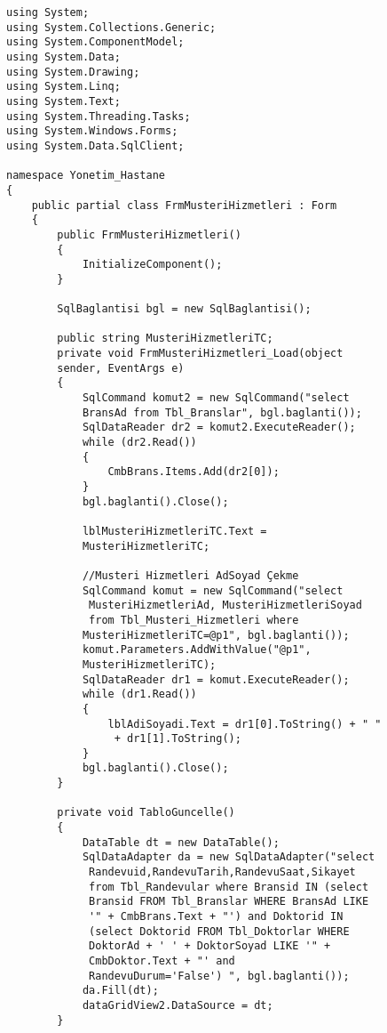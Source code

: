 \begin{lstlisting}
using System;
using System.Collections.Generic;
using System.ComponentModel;
using System.Data;
using System.Drawing;
using System.Linq;
using System.Text;
using System.Threading.Tasks;
using System.Windows.Forms;
using System.Data.SqlClient;

namespace Yonetim_Hastane
{
    public partial class FrmMusteriHizmetleri : Form
    {
        public FrmMusteriHizmetleri()
        {
            InitializeComponent();
        }

        SqlBaglantisi bgl = new SqlBaglantisi();

        public string MusteriHizmetleriTC;
        private void FrmMusteriHizmetleri_Load(object 
        sender, EventArgs e)
        {
            SqlCommand komut2 = new SqlCommand("select 
            BransAd from Tbl_Branslar", bgl.baglanti());
            SqlDataReader dr2 = komut2.ExecuteReader();
            while (dr2.Read())
            {
                CmbBrans.Items.Add(dr2[0]);
            }
            bgl.baglanti().Close();

            lblMusteriHizmetleriTC.Text = 
            MusteriHizmetleriTC;

            //Musteri Hizmetleri AdSoyad Çekme
            SqlCommand komut = new SqlCommand("select
             MusteriHizmetleriAd, MusteriHizmetleriSoyad 
             from Tbl_Musteri_Hizmetleri where 
            MusteriHizmetleriTC=@p1", bgl.baglanti());
            komut.Parameters.AddWithValue("@p1", 
            MusteriHizmetleriTC);
            SqlDataReader dr1 = komut.ExecuteReader();
            while (dr1.Read())
            {
                lblAdiSoyadi.Text = dr1[0].ToString() + " "
                 + dr1[1].ToString();
            }
            bgl.baglanti().Close();
        }

        private void TabloGuncelle()
        {
            DataTable dt = new DataTable();
            SqlDataAdapter da = new SqlDataAdapter("select
             Randevuid,RandevuTarih,RandevuSaat,Sikayet 
             from Tbl_Randevular where Bransid IN (select 
             Bransid FROM Tbl_Branslar WHERE BransAd LIKE 
             '" + CmbBrans.Text + "') and Doktorid IN 
             (select Doktorid FROM Tbl_Doktorlar WHERE 
             DoktorAd + ' ' + DoktorSoyad LIKE '" + 
             CmbDoktor.Text + "' and 
             RandevuDurum='False') ", bgl.baglanti());
            da.Fill(dt);
            dataGridView2.DataSource = dt;
        }


\end{lstlisting}
